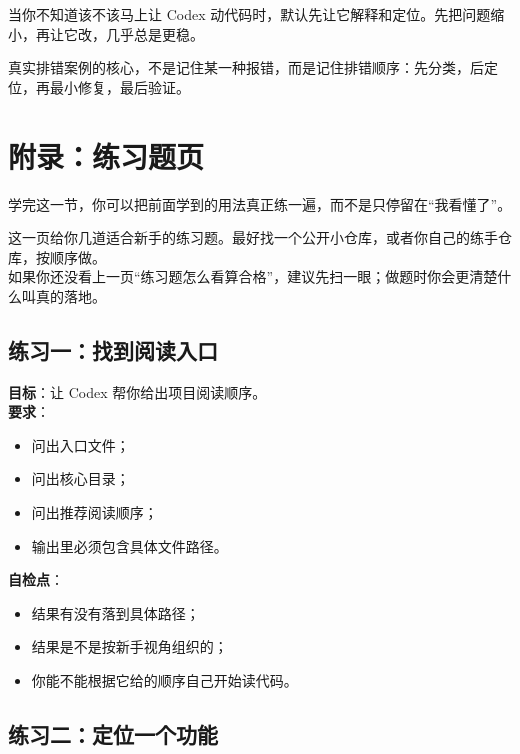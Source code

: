 \documentclass[UTF8,a4paper,12pt]{ctexart}
\begin{document}
\begin{tipbox}
当你不知道该不该马上让 Codex 动代码时，默认先让它解释和定位。先把问题缩小，再让它改，几乎总是更稳。
\end{tipbox}

\begin{sumbox}
真实排错案例的核心，不是记住某一种报错，而是记住排错顺序：先分类，后定位，再最小修复，最后验证。
\end{sumbox}

\section{附录：练习题页}

\begin{learnbox}
学完这一节，你可以把前面学到的用法真正练一遍，而不是只停留在“我看懂了”。
\end{learnbox}

这一页给你几道适合新手的练习题。最好找一个公开小仓库，或者你自己的练手仓库，按顺序做。\\
如果你还没看上一页“练习题怎么看算合格”，建议先扫一眼；做题时你会更清楚什么叫真的落地。

\subsection{练习一：找到阅读入口}

\textbf{目标}：让 Codex 帮你给出项目阅读顺序。\\
\textbf{要求}：
\begin{itemize}
  \item 问出入口文件；
  \item 问出核心目录；
  \item 问出推荐阅读顺序；
  \item 输出里必须包含具体文件路径。
\end{itemize}

\textbf{自检点}：
\begin{itemize}
  \item 结果有没有落到具体路径；
  \item 结果是不是按新手视角组织的；
  \item 你能不能根据它给的顺序自己开始读代码。
\end{itemize}

\subsection{练习二：定位一个功能}
\end{document}
